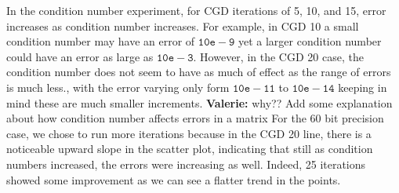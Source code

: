 \documentclass{article}
\theoremstyle{plain}
\theoremstyle{definition}
\theoremstyle{remark}
\newcommand{\vc}[1]{{\textcolor{lred}{\textbf{Valerie:} #1}}}
\begin{document}
In the condition number experiment, for CGD iterations of 5, 10, and 15, error increases as condition number increases. For example, in CGD 10 a small condition number may have an error of $\mathtt{10e-9}$ yet a larger condition number could have an error as large as $\mathtt{10e-3}$. However, in the CGD 20 case, the condition number does not seem to have as much of effect as the range of errors is much less., with the error varying only form $\mathtt{10e-11}$ to $\mathtt{10e-14}$ keeping in mind these are much smaller increments. \vc{why?? Add some explanation about how condition number affects errors in a matrix} For the 60 bit precision case, we chose to run more iterations because in the CGD 20 line, there is a noticeable upward slope in the scatter plot, indicating that still as condition numbers increased, the errors were increasing as well. Indeed, 25 iterations showed some improvement as we can see a flatter trend in the points. 
\end{document}
